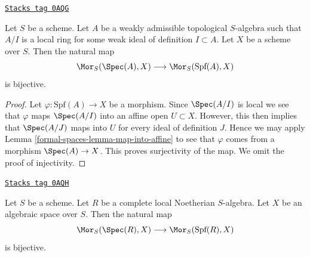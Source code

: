\begin{lemma}
\label{formal-spaces-lemma-map-into-scheme}
\href{https://stacks.math.columbia.edu/tag/0AQG}{\texttt{Stacks tag 0AQG}}

Let $S$ be a scheme. Let $A$ be a weakly admissible topological
$S$-algebra such that $A/I$ is a local ring for some weak ideal
of definition $I \subset A$. Let $X$ be a scheme over $S$. Then
the natural map
$$
\Mor_S(\Spec(A), X)
\longrightarrow
\Mor_S(\text{Spf}(A), X)
$$
is bijective.
\end{lemma}

\begin{proof}
Let $\varphi : \text{Spf}(A) \to X$ be a morphism. Since $\Spec(A/I)$
is local we see that $\varphi$ maps $\Spec(A/I)$ into an affine
open $U \subset X$. However, this then implies that $\Spec(A/J)$
maps into $U$ for every ideal of definition $J$. Hence we may
apply Lemma \ref{formal-spaces-lemma-map-into-affine} to see that $\varphi$ comes
from a morphism $\Spec(A) \to X$. This proves surjectivity of the map.
We omit the proof of injectivity.
\end{proof}

\begin{lemma}
\label{formal-spaces-lemma-map-into-algebraic-space}
\href{https://stacks.math.columbia.edu/tag/0AQH}{\texttt{Stacks tag 0AQH}}

Let $S$ be a scheme. Let $R$ be a complete local Noetherian $S$-algebra.
Let $X$ be an algebraic space over $S$. Then the natural map
$$
\Mor_S(\Spec(R), X)
\longrightarrow
\Mor_S(\text{Spf}(R), X)
$$
is bijective.
\end{lemma}

